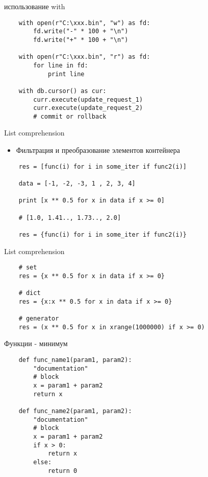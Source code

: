 \documentclass{article}
\begin{document}
\begin{center} использование with \end{center}
\vspace{15pt}
\begin{lstlisting}
	with open(r"C:\xxx.bin", "w") as fd:
	    fd.write("-" * 100 + "\n")
	    fd.write("+" * 100 + "\n")

	with open(r"C:\xxx.bin", "r") as fd:
	    for line in fd:
	    	print line

	with db.cursor() as cur:
	    curr.execute(update_request_1)
	    curr.execute(update_request_2)
		# commit or rollback
\end{lstlisting}
\newpage

\begin{center} List comprehension \end{center}
\vspace{15pt}
\begin{itemize}
	\item Фильтрация и преобразование элементов контейнера
\end{itemize}
\begin{lstlisting}
	res = [func(i) for i in some_iter if func2(i)]

	data = [-1, -2, -3, 1 , 2, 3, 4]

	print [x ** 0.5 for x in data if x >= 0]

	# [1.0, 1.41.., 1.73.., 2.0]

	res = {func(i) for i in some_iter if func2(i)}
\end{lstlisting}
\newpage

\begin{center} List comprehension \end{center}
\begin{lstlisting}
	# set
	res = {x ** 0.5 for x in data if x >= 0}

	# dict
	res = {x:x ** 0.5 for x in data if x >= 0}

	# generator
	res = (x ** 0.5 for x in xrange(1000000) if x >= 0)
\end{lstlisting}
\newpage

\begin{center} Функции - минимум \end{center}
\begin{lstlisting}
	def func_name1(param1, param2):
		"documentation"
		# block
		x = param1 + param2
		return x

	def func_name2(param1, param2):
		"documentation"
		# block
		x = param1 + param2
		if x > 0:
			return x
		else:
			return 0
\end{lstlisting}
\newpage
\end{document}
